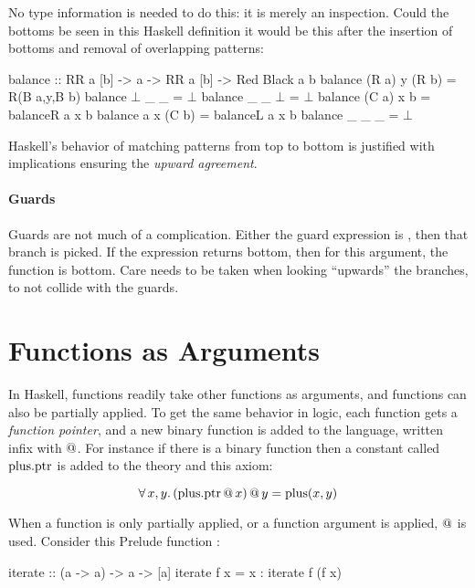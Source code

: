 No type information is needed to do this: it is merely an
inspection. Could the bottoms be seen in this Haskell definition it
would be this after the insertion of bottoms and removal of
overlapping patterns:

\begin{code}[mathescape]
balance :: RR a [b] -> a -> RR a [b] -> Red Black a b
balance (R a) y (R b) = R(B a,y,B b)
balance $\bot$      _ _     = $\bot$
balance _     _ $\bot$      = $\bot$
balance (C a) x b     = balanceR a x b
balance a     x (C b) = balanceL a x b
balance _     _ _     = $\bot$
\end{code}

Haskell's behavior of matching patterns from top to bottom is
justified with implications ensuring the \emph{upward agreement}.


\paragraph{Guards} Guards are not much of a complication. Either the guard expression is
, then that branch is picked. If the expression returns
bottom, then for this argument, the function is bottom. Care needs to
be taken when looking ``upwards'' the branches, to not collide with
the guards.

\section{Functions as Arguments}

In Haskell, functions readily take other functions as arguments, and
functions can also be partially applied. To get the same behavior in
logic, each function gets a \emph{function pointer}, and a new binary
function is added to the language, written infix with $@$.  For
instance if there is a binary function  then a constant
called $\mathrm{plus.ptr}$ is added to the theory and this axiom:

\begin{equation*}
\forall \, x , y . \,  (\mathrm{plus.ptr} \, @ \, x) \, @ \, y = \mathrm{plus}(x,y)
\end{equation*}

When a function is only partially applied, or a function argument is
applied, $@$ is used. Consider this Prelude function :

\begin{code}
iterate :: (a -> a) -> a -> [a]
iterate f x = x : iterate f (f x)
\end{code}

